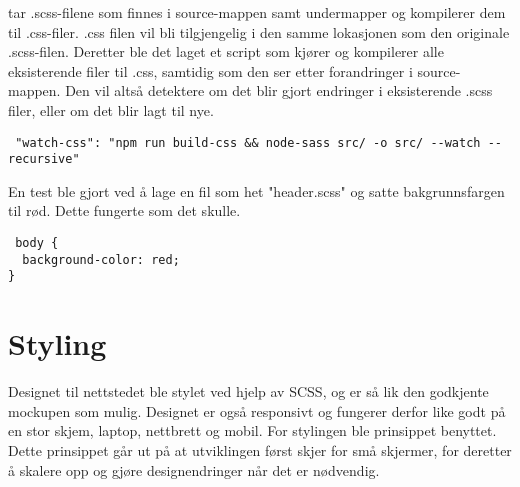  tar .scss-filene som finnes i source-mappen samt undermapper og kompilerer dem til .css-filer. .css filen vil bli tilgjengelig i den samme lokasjonen som den originale .scss-filen. Deretter ble det laget et script som kjører  og kompilerer alle eksisterende filer til .css, samtidig som den ser etter forandringer i source-mappen. Den vil altså detektere om det blir gjort endringer i eksisterende .scss filer, eller om det blir lagt til nye. 

\begin{lstlisting}
 "watch-css": "npm run build-css && node-sass src/ -o src/ --watch --recursive"
\end{lstlisting}

En test ble gjort ved å lage en fil som het "header.scss" og satte bakgrunnsfargen til rød. Dette fungerte som det skulle.

\begin{lstlisting}
 body {
  background-color: red;
}
\end{lstlisting}

\section{Styling}
Designet til nettstedet ble stylet ved hjelp av SCSS, og er så lik den godkjente mockupen som mulig. Designet er også responsivt og fungerer derfor like godt på en stor skjem, laptop, nettbrett og mobil. For stylingen ble prinsippet  benyttet. Dette prinsippet går ut på at utviklingen først skjer for små skjermer, for deretter å skalere opp og gjøre designendringer når det er nødvendig. 






